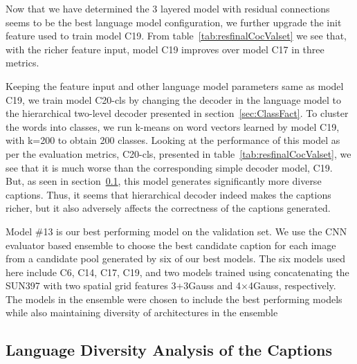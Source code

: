 Now that we have determined the 3 layered model with residual connections seems to
be the best language model configuration, we further upgrade the init feature
used to train model C19.
From table~\ref{tab:resfinalCocValset} we see that, with the richer feature
input, model C19 improves over model C17 in three metrics. 

Keeping the feature input and other language model parameters same as model C19,
we train model C20-cls by changing the decoder in the language model to the
hierarchical two-level decoder presented in section~\ref{sec:ClassFact}.
To cluster the words into classes, we run k-means on word vectors learned by
model C19, with k=200 to obtain 200 classes. 
Looking at the performance of this model as per the evaluation metrics, C20-cls,
presented in table~\ref{tab:resfinalCocValset}, we see that it is much worse
than the corresponding simple decoder model, C19.
But, as seen in section~\ref{subsubsec:QualAnalCoc}, this model generates 
significantly more diverse captions.
Thus, it seems that hierarchical decoder indeed makes the captions richer, but
it also adversely affects the correctness of the captions generated.

Model \#13 is our best performing model on the validation set. 
We use the CNN evaluator based ensemble to choose the best candidate caption for
each image from a candidate pool generated by six of our best models.
The six models used here include C6, C14, C17, C19, and two models trained
using concatenating the SUN397 with two spatial grid features 3+3Gauss and
4$\times$4Gauss, respectively.
The models in the ensemble were chosen to include the best performing models
while also maintaining diversity of architectures in the ensemble

\subsection{Language Diversity Analysis of the Captions}
\label{subsubsec:QualAnalCoc}

